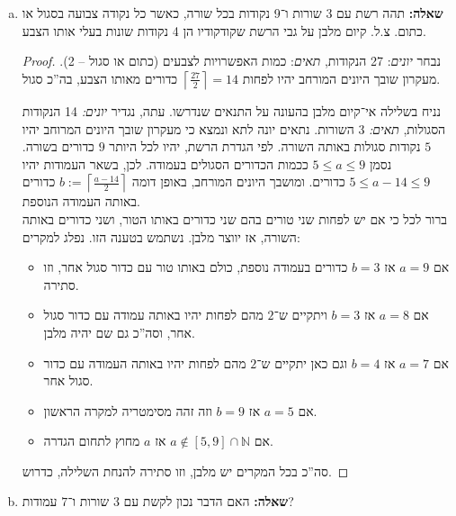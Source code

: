 \documentclass[]{article}
\newcommand\N     {\mathbb{N}}
\newcommand\rc    {\right\rceil}
\newcommand\lc    {\left\lceil}
\begin{document}
	\section{} %
	\begin{enumerate}[(a)]
		\item \textbf{שאלה: }תהה רשת עם 3 שורות ו־9 נקודות בכל שורה, כאשר כל נקודה צבועה בסגול או כתום. צ.ל. קיום מלבן על גבי הרשת שקודקודיו הן 4 נקודות שונות בעלי אותו הצבע. 
		\begin{proof}
			נבחר \textit{יונים}: 27 הנקודות, \textit{תאים}: כמות האפשרויות לצבעים (כתום או סגול – 2). מעקרון שובך היונים המורחב יהיו לפחות $\lc \frac{27}{2} \rc = 14$ כדורים מאותו הצבע, בה''כ סגול. 
			
			נניח בשלילה אי־קיום מלבן בהעונה על התנאים שנדרשו. עתה, נגדיר \textit{יונים: }14 הנקודות הסגולות, \textit{תאים: }3 השורות. נתאים יונה לתא ונמצא כי מעקרון שובך היונים המרוחב יהיו $5$ נקודות סגולות באותה השורה. לפי הגדרת הרשת, יהיו לכל היותר $9$ כדורים בשורה. נסמן $5 \le a \le 9$ ככמות הכדורים הסגולים בעמודה. לכן, בשאר העמודות יהיו $ 5 \le a - 14 \le 9 $ כדורים. ומושבך היונים המורחב, באופן דומה $b := \lc \frac{a - 14}{2} \rc$ כדורים באותה העמודה הנוספת. \\
			ברור לכל כי אם יש לפחות שני טורים בהם שני כדורים באותו הטור, ושני כדורים באותה השורה, אז יווצר מלבן. נשתמש בטענה הזו. 
			נפלג למקרים: 
			\begin{itemize}
				\item אם $a = 9$ אז $b = 3$ כדורים בעמודה נוספת, כולם באותו טור עם כדור סגול אחר, וזו סתירה. 
				\item אם $a = 8$ אז $b = 3$ ויתקיים ש־$2$ מהם לפחות יהיו באותה עמודה עם כדור סגול אחר, וסה''כ גם שם יהיה מלבן. 
				\item אם $a = 7$ אז $b = 4$ וגם כאן יתקיים ש־$2$ מהם לפחות יהיו באותה העמודה עם כדור סגול אחר. 
				\item אם $a = 5$ אז $b = 9$ וזה זהה מסימטריה למקרה הראשון. 
				\item אם $a \not \in [5, 9] \cap \N$ אז $a$ מחוץ לתחום הגדרה. 
			\end{itemize}
			סה''כ בכל המקרים יש מלבן, וזו סתירה להנחת השלילה, כדרוש. 
		\end{proof}
		\item \textbf{שאלה: }האם הדבר נכון לקשת עם $3$ שורות ו־$7 $ עמודות?
		

\end{enumerate}
\end{document}
